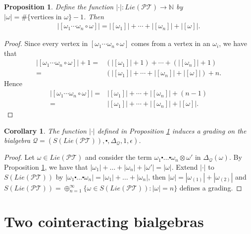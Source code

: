 \documentclass[10pt,a4paper]{article}
\newtheorem{corollary}{Corollary}[theorem]
\newtheorem{proposition}[theorem]{Proposition}
\begin{document}
\begin{proposition} 
\label{prop::2}
Define the function $| \cdot | : Lie(\mathcal{PT}) \to \mathbb{N}$ by $| \omega | = \#\{\text{vertices in }\omega \}-1$. Then
\begin{align*}
|[\omega_1 \cdots \omega_n \circ \omega   ]|=|[\omega_1]| + \cdots +|[\omega_n]|+|[\omega]|.
\end{align*}
\end{proposition}

\begin{proof}
Since every vertex in $[\omega_1 \cdots \omega_n \circ \omega]$ comes from a vertex in an $\omega_i$, we have that
\begin{align*}
|[\omega_1 \cdots \omega_n \circ \omega ]|+1=&(|[\omega_1]|+1) + \cdots +(|[\omega_n]|+1) \\
=&(|[\omega_1]| + \cdots +|[\omega_n]|+|[\omega]|)+n.
\end{align*}
Hence
\begin{align*}
|[\omega_1 \cdots \omega_n \circ \omega ]|=&|[\omega_1]| + \cdots +|[\omega_n]|+(n-1) \\
=&|[\omega_1]| + \cdots +|[\omega_n]|+|[\omega]|.
\end{align*}
\end{proof}

\begin{corollary}
The function $| \cdot |$ defined in Proposition \ref{prop::2} induces a grading on the bialgebra $\mathcal{Q}=(S(Lie(\mathcal{PT})),\centerdot,\Delta_{\mathcal{Q}},1,\epsilon)$.
\end{corollary}

\begin{proof}
Let $\omega \in Lie(\mathcal{PT})$ and consider the term $\omega_1 \centerdot \dots \centerdot \omega_n \otimes \omega'$ in $\Delta_{\mathcal{Q}}(\omega)$. By Proposition \ref{prop::2}, we have that $|\omega_1| + \dots +|\omega_n|+|\omega'|=|\omega|$. Extend $|\cdot |$ to $S(Lie(\mathcal{PT}))$ by $|\omega_1 \centerdot \dots \centerdot \omega_n|=|\omega_1| + \dots +|\omega_n|$, then $|\omega|=|\omega_{(1)}|+|\omega_{(2)}|$ and $S(Lie(\mathcal{PT}))=\oplus_{n=1}^{\infty} \{\omega \in S(Lie(\mathcal{PT})): |\omega|=n  \}$ defines a grading.
\end{proof}


\section{Two cointeracting bialgebras}
\label{section::3}
\end{document}
